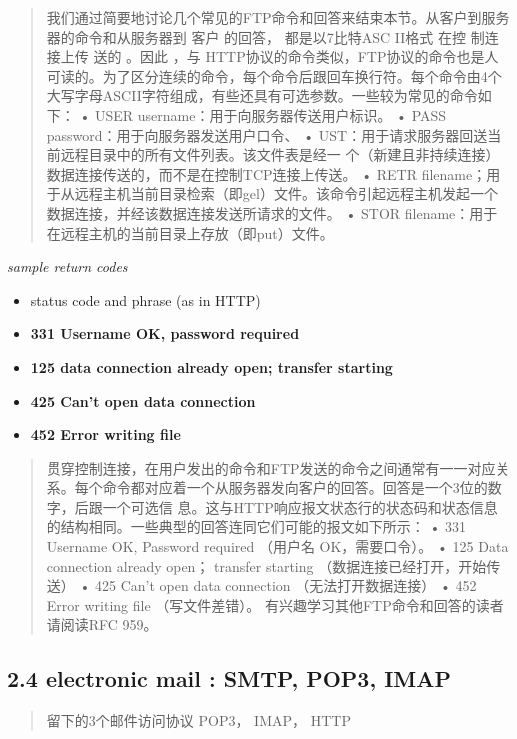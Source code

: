 \documentclass[
]{article}
\begin{document}
\begin{quote}
我们通过简要地讨论几个常见的FTP命令和回答来结束本节。从客户到服务器的命令和从服务器到
客户 的回答， 都是以7比特ASC II格式 在控 制连接上传 送的 。因此 ，与
HTTP协议的命令类似，FTP协议的命令也是人可读的。为了区分连续的命令，每个命令后跟回车换行符。每个命令由4个大写字母ASCII字符组成，有些还具有可选参数。一些较为常见的命令如下：
• USER username：用于向服务器传送用户标识。 • PASS
password：用于向服务器发送用户口令、 •
UST：用于请求服务器回送当前远程目录中的所有文件列表。该文件表是经一
个（新建且非持续连接）数据连接传送的，而不是在控制TCP连接上传送。 • RETR
filename；用于从远程主机当前目录检索（即gel）文件。该命令引起远程主机发起一个数据连接，并经该数据连接发送所请求的文件。
• STOR filename：用于在远程主机的当前目录上存放（即put）文件。
\end{quote}

\emph{sample return codes}

\begin{itemize}
\item
  status code and phrase (as in HTTP)
\item
  \textbf{331 Username OK, password required}
\item
  \textbf{125 data connection already open; transfer starting}
\item
  \textbf{425 Can't open data connection}
\item
  \textbf{452 Error writing file}
\end{itemize}

\begin{quote}
贯穿控制连接，在用户发出的命令和FTP发送的命令之间通常有一一对应关系。每个命令都对应着一个从服务器发向客户的回答。回答是一个3位的数字，后跟一个可选信
息。这与HTTP响应报文状态行的状态码和状态信息的结构相同。一些典型的回答连同它们可能的报文如下所示：
• 331 Username OK, Password required （用户名 OK，需要口令）。 • 125
Data connection already open； transfer starting
（数据连接已经打开，开始传送） • 425 Can't open data connection
（无法打开数据连接） • 452 Error writing file （写文件差错）。
有兴趣学习其他FTP命令和回答的读者请阅读RFC 959。
\end{quote}

\hypertarget{24-electronic-mail--smtp-pop3-imap}{%
\subsection{2.4 electronic mail : SMTP, POP3,
IMAP}\label{24-electronic-mail--smtp-pop3-imap}}

\begin{quote}
留下的3个邮件访问协议 POP3， IMAP， HTTP
\end{quote}
\end{document}
